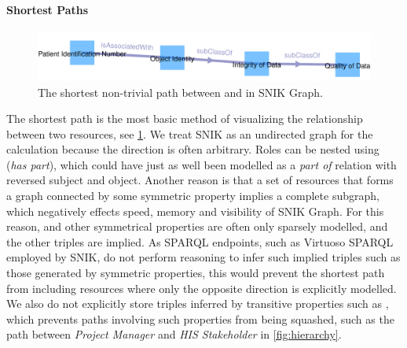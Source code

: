 \documentclass{IOS-Book-Article}     %
\begin{document}
\paragraph{Shortest Paths}
\begin{figure}[h!]
    \centering
    \includegraphics[width=\columnwidth]{img/path.png}
    \caption{The shortest non-trivial path between  and  in SNIK Graph.}
	\label{fig:path}
\end{figure}
\vspace{-3pt}
The shortest path is the most basic method of visualizing the relationship between two resources, see \cref{fig:path}.
We treat SNIK as an undirected graph for the calculation because the direction is often arbitrary.
Roles can be nested using  (\emph{has part}), which could have just as well been modelled as a \emph{part of} relation with reversed subject and object.
Another reason is that a set of resources that forms a graph connected by some symmetric property implies a complete subgraph, which negatively effects speed, memory and visibility of SNIK Graph.
For this reason,  and other symmetrical properties are often only sparsely modelled, and the other triples are implied.
As SPARQL endpoints, such as Virtuoso SPARQL employed by SNIK, do not perform reasoning to infer such implied triples such as those generated by symmetric properties, this would prevent the shortest path from including resources where only the opposite direction is explicitly modelled.%
We also do not explicitly store triples inferred by transitive properties such as , which prevents paths involving such properties from being squashed, such as the path between \emph{Project Manager} and \emph{HIS Stakeholder} in \cref{fig:hierarchy}.
\end{document}
